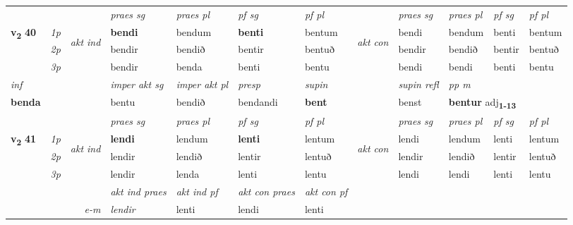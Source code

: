 \begin{longtable}[l]{X>{\footnotesize\itshape}llXXXXlXXXX}
 & &   & \textit{praes sg}  & \textit{praes pl}    & \textit{ pf sg} & \textit{pf pl} & & \textit{praes sg}  & \textit{praes pl}    & \textit{pf sg} & \textit{pf pl }  \\ \cmidrule{4-7} \cmidrule{9-12}
 \multirow{2}{*}{{{\textbf{v{\textsubscript{2}}} \Large{\textbf{40}}}}}  & 1p & \multirow{3}{*}{\begin{turn}{90}\textit{akt ind}\end{turn}} & \textbf{bendi} & bendum & \textbf{benti} & bentum & \multirow{3}{*}{\begin{turn}{90}\textit{akt con}\end{turn}} &bendi & bendum & benti & bentum\\*
 & 2p &  &  bendir  & bendið & bentir & bentuð & & bendir & bendið & bentir & bentuð \\*
 & 3p &  & bendir & benda & benti & bentu & & bendi & bendi& benti & bentu \\*
\cmidrule{4-7} \cmidrule{9-12}

   {\textit{inf}} & &  & \textit{imper akt sg} & \textit{imper akt pl}   & \textit{presp} & \textit{supin} && \textit{supin refl} & \textit{pp m} \\*
  {\textbf{benda}} & && bentu  & bendið   & bendandi &  \textbf{bent} && benst & \multicolumn{2}{l}{\textbf{bentur} adj\textbf{\textsubscript{1-13}}} \\*

\midrule

 & &   & \textit{praes sg}  & \textit{praes pl}    & \textit{ pf sg} & \textit{pf pl} & & \textit{praes sg}  & \textit{praes pl}    & \textit{pf sg} & \textit{pf pl }  \\ \cmidrule{4-7} \cmidrule{9-12}
 \multirow{2}{*}{{{\textbf{v{\textsubscript{2}}} \Large{\textbf{41}}}}}  & 1p & \multirow{3}{*}{\begin{turn}{90}\textit{akt ind}\end{turn}} & \textbf{lendi} & lendum & \textbf{lenti} & lentum & \multirow{3}{*}{\begin{turn}{90}\textit{akt con}\end{turn}} &lendi & lendum & lenti & lentum\\*
 & 2p &  &  lendir  & lendið & lentir & lentuð & & lendir & lendið & lentir & lentuð \\*
 & 3p &  & lendir & lenda & lenti & lentu & & lendi & lendi& lenti & lentu \\*
\cmidrule{4-7} \cmidrule{9-12}

   && &  \textit{akt ind praes} & \textit{akt ind pf} & \textit{akt con praes} & \textit{akt con pf} \\*
\multicolumn{3}{r}{\textit{e-m}} & lendir & lenti & lendi & lenti \\*


\end{longtable}
